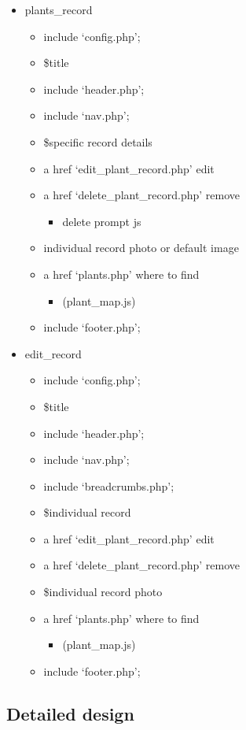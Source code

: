 \begin{itemize}
	\item plants\_record
	\begin{itemize}
		\item include `config.php';
		\item \$title
		\item include `header.php';
		\item include `nav.php';
		\item \$specific record details
		\item a href `edit\_plant\_record.php' edit
		\item a href `delete\_plant\_record.php' remove
		\begin{itemize}
			\item delete prompt js
		\end{itemize}
		\item individual record photo or default image
		\item a href `plants.php' where to find
		\begin{itemize}
			\item (plant\_map.js)
		\end{itemize}
		\item include `footer.php';
	\end{itemize}

	\item edit\_record
	\begin{itemize}
		\item include `config.php';
		\item \$title
		\item include `header.php';
		\item include `nav.php';
		\item include `breadcrumbs.php';
		\item \$individual record
		\item a href `edit\_plant\_record.php' edit
		\item a href `delete\_plant\_record.php' remove
		\item \$individual record photo
		\item a href `plants.php' where to find
		\begin{itemize}
			\item (plant\_map.js)
		\end{itemize}
		\item include `footer.php';
	\end{itemize}
\end{itemize}
		
\subsection{Detailed design}
